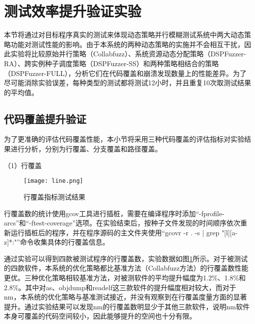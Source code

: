 \documentclass[master]{thesis-uestc}
\begin{document}
\section{测试效率提升验证实验}

本节将通过对目标程序真实的测试来体现动态策略并行模糊测试系统中两大动态策略功能对测试性能的影响。由于本系统的两种动态策略的实施并不会相互干扰，因此实验将比较原始并行策略（Collabfuzz）、系统资源动态分配策略（DSPFuzzer-RA）、跨实例种子调度策略（DSPFuzzer-SS）和两种策略相结合的策略（DSPFuzzer-FULL），分析它们在代码覆盖和崩溃发现数量上的性能差异。为了尽可能消除实验误差，每种类型的测试都将测试12小时，并且重复10次取测试结果的平均值。

\subsection{代码覆盖提升验证}

为了更准确的评估代码覆盖性能，本小节将采用三种代码覆盖的评估指标对实验结果进行分析，分别为行覆盖、分支覆盖和路径覆盖。



（1）行覆盖

\begin{figure}[!htbp]
    \vspace{6pt}
    \centering
    \texttt{[image: line.png]}
    \caption{行覆盖指标测试结果}
    \label{line}
\end{figure}
 
行覆盖数的统计使用gcov工具进行插桩，需要在编译程序时添加“-fprofile-arcs”和“-ftest-coverage”选项。在实验结束后，按种子文件发现的时间顺序依次重新运行插桩后的程序，并在程序源码的主文件夹使用“gcovr -r . -s | grep "[l][a-z]*:"”命令收集具体的行覆盖信息。

通过实验可以得到四款被测试程序的行覆盖数，实验数据如图\ref{line}所示。对于被测试的四款软件，本系统的优化策略都比基准方法（Collabfuzz方法）的行覆盖数性能更优。三种优化策略相较基准方法，对被测软件的平均提升幅度为1.2\%、1.8\%和2.8\%。其中对as、objdump和readelf这三款软件的提升幅度相对较大，而对于nm，本系统的优化策略与基准测试接近，并没有观察到在行覆盖度量方面的显著提升。通过实验结果可以发现nm的行覆盖数明显少于其他三款软件，说明nm软件本身可覆盖的代码空间较小，因此能够提升的空间也十分有限。
\end{document}

